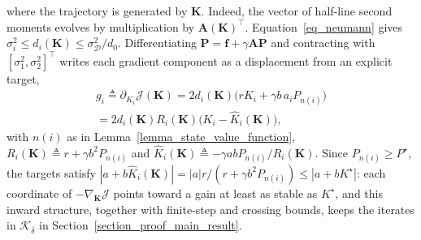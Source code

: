 \documentclass[letterpaper, 10 pt, conference]{ieeeconf}
\newcommand{\mbf}{\mathbf{f}}
\newcommand{\bA}{\mathbf{A}}
\newcommand{\bK}{\mathbf{K}}
\newcommand{\bP}{\mathbf{P}}
\newcommand{\cD}{\mathcal{D}}
\newcommand{\cJ}{\mathcal{J}}
\newcommand{\cK}{\mathcal{K}}
\newcommand{\Lemm}{Lemma}
\newcommand{\Sect}{Section}
\begin{document}
\noindent where the trajectory is generated by $\bK$. Indeed, the vector of half-line second moments evolves by multiplication by $\bA(\bK)^\top$.
Equation~\eqref{eq_neumann} gives $\sigma_i^2\le d_i(\bK)\le\sigma_{\cD}^2/d_0$. Differentiating $\bP=\mbf+\gamma\bA\bP$ and contracting with $[\sigma_1^2,\sigma_2^2]^{\top}$ writes each gradient component as a displacement from an explicit target,
\vspace{-0.2cm}
\begin{equation}\label{eq_occupancy_gradient}
    \begin{gathered}
    g_i\triangleq\partial_{K_i}\cJ(\bK)
      =2d_i(\bK)\bigl(rK_i+\gamma b\,a_iP_{n(i)}\bigr)
      \\
      =2d_i(\bK)R_i(\bK)\bigl(K_i-\widehat K_i(\bK)\bigr),
    \end{gathered}
\end{equation}
with $n(i)$ as in \Lemm~\ref{lemma_state_value_function}, $R_i(\bK)\triangleq r+\gamma b^2P_{n(i)}$ and $\widehat K_i(\bK)\triangleq-\gamma abP_{n(i)}/R_i(\bK)$. Since $P_{n(i)}\ge P^{\star}$, the targets satisfy $|a+b\widehat K_i(\bK)|=|a|r/(r+\gamma b^2P_{n(i)})\le|a+bK^{\star}|$: each coordinate of $-\nabla_{\bK}\cJ$ points toward a gain at least as stable as $K^{\star}$, and this inward structure, together with finite-step and crossing bounds, keeps the iterates in $\cK_{\overline{\delta}}$ in \Sect~\ref{section_proof_main_result}.
\end{document}
